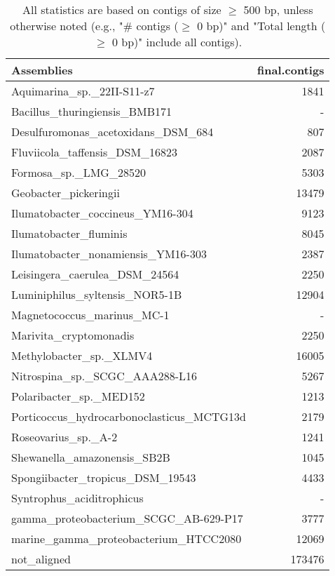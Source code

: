 \documentclass[12pt,a4paper]{article}
\begin{document}
\begin{table}[ht]
\begin{center}
\caption{All statistics are based on contigs of size $\geq$ 500 bp, unless otherwise noted (e.g., "\# contigs ($\geq$ 0 bp)" and "Total length ($\geq$ 0 bp)" include all contigs).}
\begin{tabular}{|l*{1}{|r}|}
\hline
Assemblies & final.contigs \\ \hline
Aquimarina\_sp.\_22II-S11-z7 & 1841 \\ \hline
Bacillus\_thuringiensis\_BMB171 & - \\ \hline
Desulfuromonas\_acetoxidans\_DSM\_684 & 807 \\ \hline
Fluviicola\_taffensis\_DSM\_16823 & 2087 \\ \hline
Formosa\_sp.\_LMG\_28520 & 5303 \\ \hline
Geobacter\_pickeringii & 13479 \\ \hline
Ilumatobacter\_coccineus\_YM16-304 & 9123 \\ \hline
Ilumatobacter\_fluminis & 8045 \\ \hline
Ilumatobacter\_nonamiensis\_YM16-303 & 2387 \\ \hline
Leisingera\_caerulea\_DSM\_24564 & 2250 \\ \hline
Luminiphilus\_syltensis\_NOR5-1B & 12904 \\ \hline
Magnetococcus\_marinus\_MC-1 & - \\ \hline
Marivita\_cryptomonadis & 2250 \\ \hline
Methylobacter\_sp.\_XLMV4 & 16005 \\ \hline
Nitrospina\_sp.\_SCGC\_AAA288-L16 & 5267 \\ \hline
Polaribacter\_sp.\_MED152 & 1213 \\ \hline
Porticoccus\_hydrocarbonoclasticus\_MCTG13d & 2179 \\ \hline
Roseovarius\_sp.\_A-2 & 1241 \\ \hline
Shewanella\_amazonensis\_SB2B & 1045 \\ \hline
Spongiibacter\_tropicus\_DSM\_19543 & 4433 \\ \hline
Syntrophus\_aciditrophicus & - \\ \hline
gamma\_proteobacterium\_SCGC\_AB-629-P17 & 3777 \\ \hline
marine\_gamma\_proteobacterium\_HTCC2080 & 12069 \\ \hline
not\_aligned & 173476 \\ \hline
\end{tabular}
\end{center}
\end{table}
\end{document}
